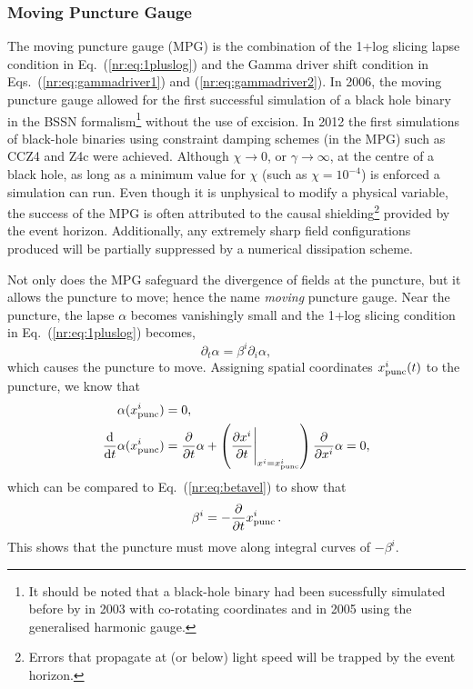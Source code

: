 \subsubsection{Moving Puncture Gauge}
The moving puncture gauge (MPG) is the combination of the 1+log slicing lapse condition
in Eq.~(\ref{nr:eq:1pluslog}) and the Gamma driver shift condition in
Eqs.~(\ref{nr:eq:gammadriver1}) and (\ref{nr:eq:gammadriver2}). In 2006, the
moving puncture gauge allowed for the first successful simulation of a black hole
binary \cite{PhysRevLett.96.111101} in the BSSN
formalism\footnote{It should be noted that a black-hole binary had been sucessfully
simulated before by \cite{Bruegmann:2003aw} in 2003 with co-rotating coordinates
and \cite{Pretorius:2005gq} in 2005 using the generalised harmonic gauge.} without
the use of excision. In 2012 the first simulations of black-hole binaries
using constraint damping schemes (in the MPG) such as CCZ4 \cite{alic2012conformal}
and Z4c \cite{Hilditch:2012fp} were achieved.
Although $\chi\rightarrow 0$, or $\gamma \rightarrow \infty$,
at the centre of a black hole, as long as a minimum value for $\chi$
(such as $\chi=10^{-4}$) is enforced a simulation can run. Even though it is
unphysical to modify a physical variable, the success of the MPG is often attributed
to the causal shielding\footnote{Errors that propagate at (or below) light speed
will be trapped by the event horizon. } provided by the
event horizon. Additionally, any extremely sharp field configurations produced will
be partially suppressed by a numerical dissipation scheme.

Not only does the MPG safeguard the divergence of fields at the puncture, but it allows the puncture to move; hence the name {\it moving} puncture gauge. Near the puncture, the lapse $\alpha$ becomes vanishingly small and the 1+log slicing condition in Eq.~(\ref{nr:eq:1pluslog}) becomes,
\begin{equation}
\partial_t \alpha = \beta^i \partial_i \alpha, \label{nr:eq:betavel}
\end{equation}
which causes the puncture to move. Assigning spatial coordinates $x^i_{\rm punc}(t)$ to the puncture, we know that
\begin{align}
\alpha(x^i_{\rm punc}) &= 0,\\
\frac{\dd}{\dd t} \alpha(x^i_{\rm punc})  &= \frac{\partial}{\partial t}\alpha + \left(\frac{\partial x^i}{\partial t}\Bigg|_{x^i=x^i_{\rm punc}}\right)\frac{\partial}{\partial x^i} \alpha =0,
\end{align}
which can be compared to Eq.~(\ref{nr:eq:betavel}) to show that
\begin{equation}
\beta^i = -\frac{\partial }{\partial t}x^i_{\rm punc}\,.
\end{equation}
This shows that the puncture must move along integral curves of $-\beta^i$.
